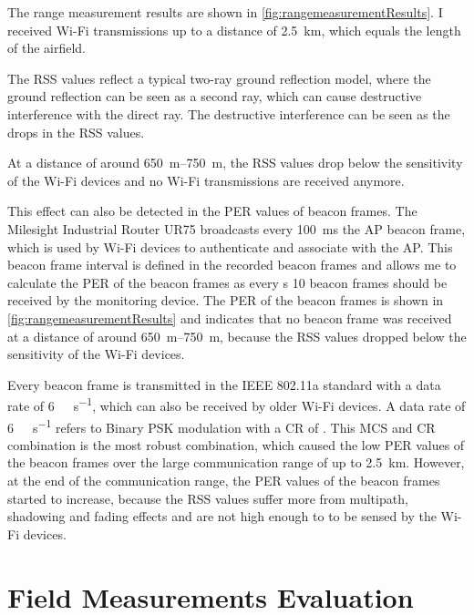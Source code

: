 The range measurement results are shown in \autoref{fig:rangemeasurementResults}.
I received Wi-Fi transmissions up to a distance of \SI{2.5}{\kilo\metre},
which equals the length of the airfield.

The \ac{RSS} values reflect a typical two-ray ground reflection model, where the ground reflection can be seen as a second ray,
which can cause destructive interference with the direct ray.
The destructive interference can be seen as the drops in the \ac{RSS} values.

At a distance of around \SIrange{650}{750}{\metre}, the \ac{RSS} values drop below the sensitivity of the Wi-Fi devices and
no Wi-Fi transmissions are received anymore.

This effect can also be detected in the \ac{PER} values of beacon frames.
The Milesight Industrial Router UR75 broadcasts every \SI{100}{\milli\second} the \ac{AP} beacon frame, which is used by Wi-Fi devices to
authenticate and associate with the \ac{AP}.
This beacon frame interval is defined in the recorded beacon frames and allows me to
calculate the \ac{PER} of the beacon frames as every \si{\second} \num{10} beacon frames should be received by the monitoring device.
The \ac{PER} of the beacon frames is shown in \autoref{fig:rangemeasurementResults} and indicates that no beacon frame was received at
a distance of around \SIrange{650}{750}{\metre}, because the \ac{RSS} values dropped below the sensitivity of the Wi-Fi devices.

Every beacon frame is transmitted in the IEEE 802.11a standard with a data rate of \SI{6}{\mega\bit\per\second}, which can also be received
by older Wi-Fi devices.
A data rate of \SI{6}{\mega\bit\per\second} refers to Binary \ac{PSK} modulation with a \ac{CR} of  \cite{ieee_standard_1999}.
This \ac{MCS} and \ac{CR} combination is the most robust combination, which caused the low \ac{PER} values of the beacon frames over
the large communication range of up to \SI{2.5}{\kilo\metre}.
However, at the end of the communication range, the \ac{PER} values of the beacon frames
started to increase, because the \ac{RSS} values suffer more from multipath, shadowing and fading effects and are not high enough to
to be sensed by the Wi-Fi devices.

\section{Field Measurements Evaluation}

